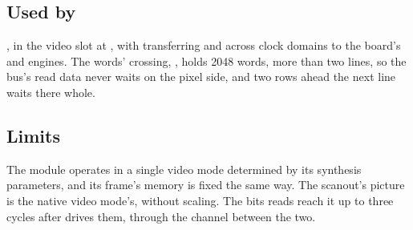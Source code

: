 \subsection*{Used by}

, in the video slot at ,
with  transferring  and  across
clock domains to the board's  and 
engines. The words' crossing, , holds 2048 words,
more than two lines, so the bus's read data never waits on the pixel
side, and two rows ahead the next line waits there whole.

\subsection*{Limits}

The module operates in a single video mode determined by its synthesis
parameters, and its frame's memory is fixed the same way. The
scanout's picture is the native video mode's, without scaling. The
bits  reads reach it up to three cycles after
 drives them, through the channel between the two.

